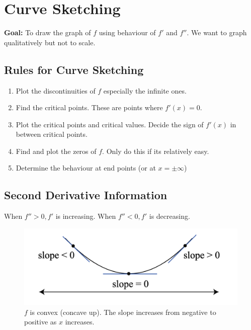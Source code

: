 

\chapter{Curve Sketching}

\bigbreak

{\bf Goal: } To draw the graph of $f$ using behaviour of $f'$ and $f''$.
We want to graph qualitatively but not to scale.


\section{Rules for Curve Sketching}

\begin{enumerate}
	\item Plot the discontinuities of $f$ especially the infinite ones.
	\item Find the critical points. These are points where $f'(x) = 0$.
	\item Plot the critical points and critical values. Decide the sign of $f'(x)$ in between critical points.
	\item Find and plot the zeros of $f$. Only do this if its relatively easy.
	\item Determine the behaviour at end points (or at $x = \pm \infty$)
\end{enumerate}


\section{Second Derivative Information}

When $f'' > 0, f'$ is increasing. When $f'' < 0, f'$ is decreasing.


\begin{figure}[ht!]
	\centering
	\includegraphics[scale=0.65]{./images/lecture_8_figure_1.png}
	\caption{$f$ is convex (concave up). The slope increases from negative to positive as $x$ increases.}
\end{figure}



